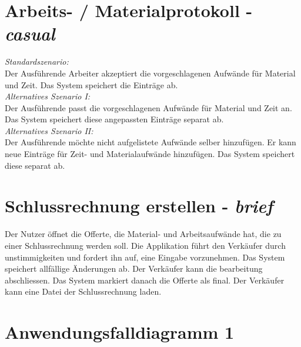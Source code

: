 \documentclass[journal]{combine}
\begin{document}
	\newpage
	\section{Arbeits- / Materialprotokoll  - \emph{casual}}
		\emph{Standardszenario:} \\
		Der Ausführende Arbeiter akzeptiert die vorgeschlagenen Aufwände für Material
		und Zeit. Das System speichert die Einträge ab.\\
		\emph{Alternatives Szenario I:}\\
		Der Ausführende passt die vorgeschlagenen Aufwände für Material und Zeit an.
		Das System speichert diese angepassten Einträge separat ab.\\	
		\emph{Alternatives Szenario II:}\\
		Der Ausführende möchte nicht aufgelistete Aufwände selber hinzufügen. Er kann neue
		Einträge für Zeit- und Materialaufwände hinzufügen. Das System speichert diese separat ab.
	\newpage
	\section{Schlussrechnung erstellen - \emph{brief}}
		Der Nutzer öffnet die Offerte, die Material- und Arbeitsaufwände hat,
		die zu einer Schlussrechnung werden soll. Die Applikation führt den Verkäufer durch
		unstimmigkeiten und fordert ihn auf, eine Eingabe vorzunehmen. Das System
		speichert allfällige Änderungen ab. Der Verkäufer kann die bearbeitung abschliessen.
		Das System markiert danach die Offerte als final. Der Verkäufer kann eine Datei der 
		Schlussrechnung laden.

	\newpage
	\section{Anwendungsfalldiagramm 1}
\end{document}
